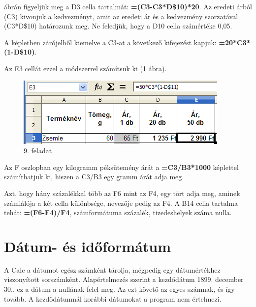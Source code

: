  ábrán figyeljük meg a D3 cella tartalmát:
\textsf{\textbf{=(C3-C3*D\$10)*20}}. Az eredeti árból (C3) kivonjuk
a kedvezményt, amit az eredeti ár és a kedvezmény szorzatával
(C3*D\$10) határozunk meg. Ne feledjük, hogy a D10 cella
számértéke 0,05.

A képletben zárójelből kiemelve a C3-at a következő
kifejezést kapjuk:  \textsf{\textbf{=20*C3*(1-D\$10)}}.

Az E3 cellát ezzel a módszerrel számítsuk ki (\ref{9-feladatE3} ábra).

\begin{figure}[!h]
\begin{center}
\includegraphics[width=10.396cm]{oocalcv2-img45.png}
\caption{9. feladat}\label{9-feladatE3}
\end{center}
\end{figure}

Az F oszlopban egy kilogramm péksütemény árát a
\textsf{\textbf{=}}\textsf{\textbf{C3/B3*1000}} képlettel
számíthatjuk ki, hiszen a C3/B3 egy gramm árát adja meg.

Azt, hogy hány százalékkal több az F6 mint az F4, egy tört
adja meg, aminek számlálója a két cella különbsége,
nevezője pedig az F4. A B14 cella tartalma tehát:
\textsf{\textbf{=(F6-F4)/F4}}, számformátuma százalék,
tizedeshelyek száma nulla.


\section{Dátum- és időformátum}

A Calc a dátumot egész számként tárolja, mégpedig egy
dátumértékhez viszonyított sorszámként. Alapértelmezés
szerint a kezdődátum 1899. december 30., ez a dátum a
nullának felel meg. Az ezt követő az egyes számnak, és
így tovább. A kezdődátumnál korábbi dátumokat a program
nem értelmezi.

